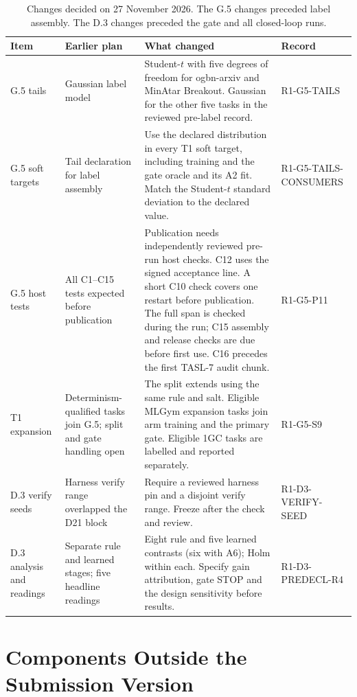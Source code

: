 \begin{table}[t]
\caption{Changes decided on 27 November 2026. The G.5 changes preceded label assembly. The D.3 changes preceded the gate and all closed-loop runs.}
\label{tab:dev-27nov}
\footnotesize
\setlength{\tabcolsep}{3pt}
\begin{tabular}{L{0.8in}L{1.3in}L{2.8in}L{1.3in}}
\toprule
Item & Earlier plan & What changed & Record \\
\midrule
G.5 tails & Gaussian label model & Student-$t$ with five degrees of freedom for ogbn-arxiv and MinAtar Breakout. Gaussian for the other five tasks in the reviewed pre-label record. & R1-G5-TAILS \\
\addlinespace
G.5 soft targets & Tail declaration for label assembly & Use the declared distribution in every T1 soft target, including training and the gate oracle and its A2 fit. Match the Student-$t$ standard deviation to the declared value. & R1-G5-TAILS-CONSUMERS \\
\addlinespace
G.5 host tests & All C1--C15 tests expected before publication & Publication needs independently reviewed pre-run host checks. C12 uses the signed acceptance line. A short C10 check covers one restart before publication. The full span is checked during the run; C15 assembly and release checks are due before first use. C16 precedes the first TASL-7 audit chunk. & R1-G5-P11 \\
\addlinespace
T1 expansion & Determinism-qualified tasks join G.5; split and gate handling open & The split extends using the same rule and salt. Eligible MLGym expansion tasks join arm training and the primary gate. Eligible 1GC tasks are labelled and reported separately. & R1-G5-S9 \\
\addlinespace
D.3 verify seeds & Harness verify range overlapped the D21 block & Require a reviewed harness pin and a disjoint verify range. Freeze after the check and review. & R1-D3-VERIFY-SEED \\
\addlinespace
D.3 analysis and readings & Separate rule and learned stages; five headline readings & Eight rule and five learned contrasts (six with A6); Holm within each. Specify gain attribution, gate STOP and the design sensitivity before results. & R1-D3-PREDECL-R4 \\
\bottomrule
\end{tabular}
\end{table}

\section{Components Outside the Submission Version}
\label{app:scope}

